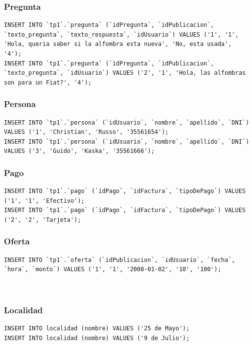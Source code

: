 \documentclass[a4paper, 10pt, twoside]{article}
\begin{document}
\subsubsection{Pregunta}
\begin{verbatim}
INSERT INTO `tp1`.`pregunta` (`idPregunta`, `idPublicacion`, `texto_pregunta`, `texto_respuesta`, `idUsuario`) VALUES ('1', '1', 'Hola, queria saber si la alfombra esta nueva', 'No, esta usada', '4');
INSERT INTO `tp1`.`pregunta` (`idPregunta`, `idPublicacion`, `texto_pregunta`, `idUsuario`) VALUES ('2', '1', 'Hola, las alfombras son para un Fiat?', '4');

\end{verbatim}
\subsubsection{Persona}
\begin{verbatim}
INSERT INTO `tp1`.`persona` (`idUsuario`, `nombre`, `apellido`, `DNI`) VALUES ('1', 'Christian', 'Russo', '35561654');
INSERT INTO `tp1`.`persona` (`idUsuario`, `nombre`, `apellido`, `DNI`) VALUES ('3', 'Guido', 'Kaska', '35561666');

\end{verbatim}
\subsubsection{Pago}
\begin{verbatim}
INSERT INTO `tp1`.`pago` (`idPago`, `idFactura`, `tipoDePago`) VALUES ('1', '1', 'Efectivo');
INSERT INTO `tp1`.`pago` (`idPago`, `idFactura`, `tipoDePago`) VALUES ('2', '2', 'Tarjeta');

\end{verbatim}
\subsubsection{Oferta}
\begin{verbatim}
INSERT INTO `tp1`.`oferta` (`idPublicacion`, `idUsuario`, `fecha`, `hora`, `monto`) VALUES ('1', '1', '2008-01-02', '10', '100');



\end{verbatim}
\subsubsection{Localidad}
\begin{verbatim}
INSERT INTO localidad (nombre) VALUES ('25 de Mayo');
INSERT INTO localidad (nombre) VALUES ('9 de Julio');
\end{verbatim}
\end{document}
